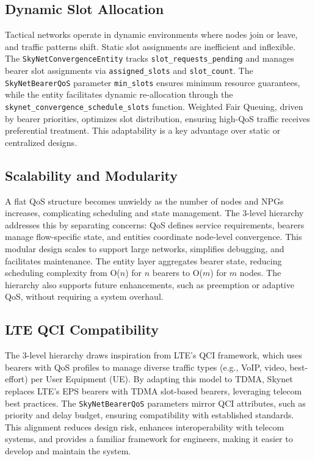 \documentclass{article}
\begin{document}
\subsection{Dynamic Slot Allocation}
Tactical networks operate in dynamic environments where nodes join or leave,
and traffic patterns shift. Static slot assignments are inefficient and inflexible.
The \texttt{SkyNetConvergenceEntity} tracks \texttt{slot\_requests\_pending} and
manages bearer slot assignments via \texttt{assigned\_slots} and \texttt{slot\_count}.
The \texttt{SkyNetBearerQoS} parameter \texttt{min\_slots} ensures minimum resource
guarantees, while the entity facilitates dynamic re-allocation through
the \texttt{skynet\_convergence\_schedule\_slots} function.
Weighted Fair Queuing, driven by bearer priorities, optimizes slot distribution,
ensuring high-QoS traffic receives preferential treatment.
This adaptability is a key advantage over static or centralized designs.

\subsection{Scalability and Modularity}
A flat QoS structure becomes unwieldy as the number of nodes and NPGs increases,
complicating scheduling and state management. The 3-level hierarchy addresses this
by separating concerns: QoS defines service requirements, bearers manage
flow-specific state, and entities coordinate node-level convergence.
This modular design scales to support large networks, simplifies debugging,
and facilitates maintenance. The entity layer aggregates bearer state, reducing
scheduling complexity from O($n$) for $n$ bearers to O($m$) for $m$ nodes.
The hierarchy also supports future enhancements, such as preemption or adaptive QoS,
without requiring a system overhaul.

\subsection{LTE QCI Compatibility}
The 3-level hierarchy draws inspiration from LTE's QCI framework,
which uses bearers with QoS profiles to manage diverse traffic
types (e.g., VoIP, video, best-effort) per User Equipment (UE).
By adapting this model to TDMA, Skynet replaces LTE's EPS bearers with
TDMA slot-based bearers, leveraging telecom best practices.
The \texttt{SkyNetBearerQoS} parameters mirror QCI attributes,
such as priority and delay budget, ensuring compatibility with established standards.
This alignment reduces design risk, enhances interoperability with telecom systems,
and provides a familiar framework for engineers, making it easier to develop and maintain the system.
\end{document}
